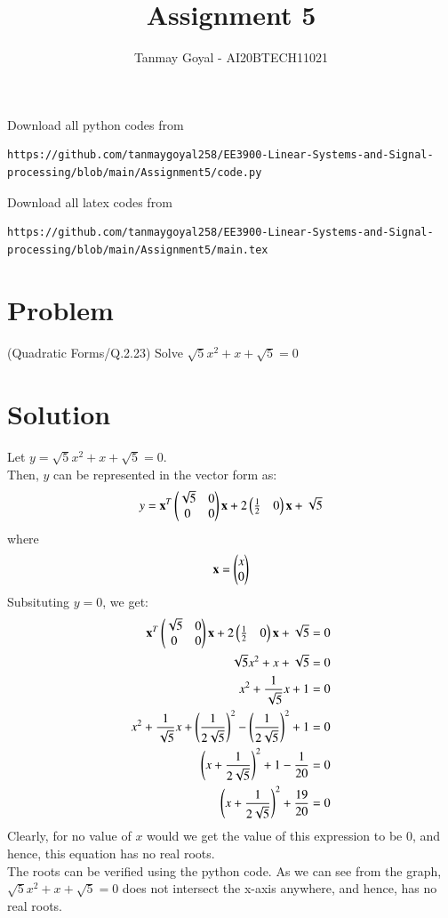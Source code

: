 \documentclass[journal,12pt,twocolumn]{IEEEtran}
\begin{document}
\def\putbox#1#2#3{\makebox[0in][l]{\makebox[#1][l]{}\raisebox{\baselineskip}[0in][0in]{\raisebox{#2}[0in][0in]{#3}}}}
     \def\rightbox#1{\makebox[0in][r]{#1}}
     \def\centbox#1{\makebox[0in]{#1}}
     \def\topbox#1{\raisebox{-\baselineskip}[0in][0in]{#1}}
     \def\midbox#1{\raisebox{-0.5\baselineskip}[0in][0in]{#1}}
\vspace{3cm}
\title{Assignment 5}
\author{Tanmay Goyal - AI20BTECH11021}
\maketitle
\newpage
\bigskip
\renewcommand{\thefigure}{\theenumi}
\renewcommand{\thetable}{\theenumi}
Download all python codes from 
\begin{lstlisting}
https://github.com/tanmaygoyal258/EE3900-Linear-Systems-and-Signal-processing/blob/main/Assignment5/code.py
\end{lstlisting}
Download all latex codes from 
\begin{lstlisting}
https://github.com/tanmaygoyal258/EE3900-Linear-Systems-and-Signal-processing/blob/main/Assignment5/main.tex
\end{lstlisting}
\section{Problem}
(Quadratic Forms/Q.2.23) Solve $\sqrt{5}x^2 + x + \sqrt{5} = 0$
\section{Solution}
Let $y = \sqrt{5}x^2 + x + \sqrt{5} = 0$. \\Then, $y$ can be represented in the vector form as:
\begin{align}
    y = \mathbf{x}^T \begin{pmatrix}\sqrt{5} & 0\\0 & 0\end{pmatrix}\mathbf{x} + 2\begin{pmatrix}\frac{1}{2} & 0\end{pmatrix}\mathbf{x} + \sqrt{5}
\end{align}
where 
\begin{align}
    \mathbf{x} = \begin{pmatrix}x\\0\end{pmatrix}
\end{align}
Subsituting $y = 0$, we get:
\begin{align}
    \mathbf{x}^T \begin{pmatrix}\sqrt{5} & 0\\0 & 0\end{pmatrix}\mathbf{x} + 2\begin{pmatrix}\frac{1}{2} & 0\end{pmatrix}\mathbf{x} + \sqrt{5} = 0\\
    \sqrt{5}x^2 + x + \sqrt{5} = 0\\
    x^2 + \frac{1}{\sqrt{5}}x + 1 = 0\\
    x^2 + \frac{1}{\sqrt{5}}x + \left(\frac{1}{2\sqrt{5}}\right)^2 - \left(\frac{1}{2\sqrt{5}}\right)^2 + 1 = 0\\
    \left(x + \frac{1}{2\sqrt{5}}\right)^2 + 1 - \frac{1}{20} = 0\\
    \left(x + \frac{1}{2\sqrt{5}}\right)^2 + \frac{19}{20} = 0
\end{align}
Clearly, for no value of $x$ would we get the value of this expression to be $0$, and hence, this equation has no real roots.\\
The roots can be verified using the python code. As we can see from the graph, $\sqrt{5}x^2 + x + \sqrt{5} = 0$ does not intersect the x-axis anywhere, and hence, has no real roots.\\
\end{document}
